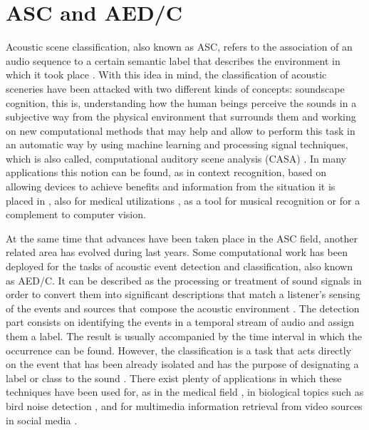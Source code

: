 \section{ASC and AED/C}

Acoustic scene classification, also known as ASC, refers to the association of an audio sequence to a certain semantic label that describes the environment in which it took place \cite{Barchiesi2015}. With this idea in mind, the classification of acoustic sceneries have been attacked with two different kinds of concepts: soundscape cognition, this is, understanding how the human beings perceive the sounds in a subjective way from the physical environment that surrounds them  \cite{Dubois2006} and working on new computational methods that may help and allow to perform this task in an automatic way by using machine learning and processing signal techniques, which is also called, computational auditory scene analysis (CASA) \cite{Wang2006}. In many applications this notion can be found, as in context recognition, based on allowing devices to achieve benefits and information from the situation it is placed in \cite{Eronen2006}, also for medical utilizations \cite{Bahoura2009}, as a tool for musical recognition \cite{Van2013} or for a complement to computer vision.

At the same time that advances have been taken place in the ASC field, another related area has evolved during last years. Some computational work has been deployed for the tasks of acoustic event detection and classification, also known as AED/C. It can be described as the processing or treatment of sound signals in order to convert them into significant descriptions that match a listener's sensing of the events and sources that compose the acoustic environment \cite{Temko2009}. The detection part consists on identifying the events in a temporal stream of audio and assign them a label. The result is usually accompanied by the time interval in which the occurrence can be found. However, the classification is a task that acts directly on the event that has been already isolated and has the purpose of designating a label or class to the sound \cite{Temko2007}. There exist plenty of applications in which these techniques have been used for, as in the medical field \cite{Bahoura2010}, in biological topics such as bird noise detection \cite{Potamitis2014}, and for multimedia information retrieval from video sources in social media \cite{Wang2016}.

